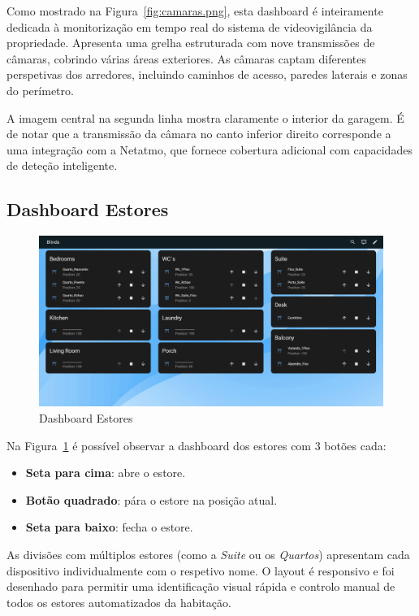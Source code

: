 Como mostrado na Figura~\ref{fig:camaras.png}, esta dashboard é inteiramente dedicada à monitorização em tempo real do sistema de videovigilância da propriedade. Apresenta uma grelha estruturada com nove transmissões de câmaras, cobrindo várias áreas exteriores. As câmaras captam diferentes perspetivas dos arredores, incluindo caminhos de acesso, paredes laterais e zonas do perímetro.

A imagem central na segunda linha mostra claramente o interior da garagem. É de notar que a transmissão da câmara no canto inferior direito corresponde a uma integração com a Netatmo, que fornece cobertura adicional com capacidades de deteção inteligente.

\subsection{Dashboard Estores}

\begin{figure}[H]
    \centering
    \includegraphics[width=\textwidth]{images/estores.png}
    \caption{Dashboard Estores}
    \label{fig: estores.png}
\end{figure}

Na Figura~\ref{fig: estores.png} é possível observar a dashboard dos estores com 3 botões cada:

\begin{itemize}
    \item \textbf{Seta para cima}: abre o estore.
    \item \textbf{Botão quadrado}: pára o estore na posição atual.
    \item \textbf{Seta para baixo}: fecha o estore.
\end{itemize}

As divisões com múltiplos estores (como a \textit{Suite} ou os \textit{Quartos}) apresentam cada dispositivo individualmente com o respetivo nome. O layout é responsivo e foi desenhado para permitir uma identificação visual rápida e controlo manual de todos os estores automatizados da habitação.

